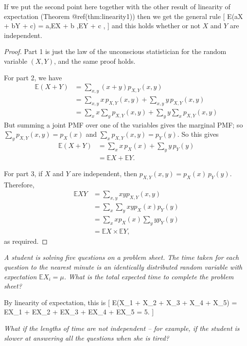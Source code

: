 \documentclass[
  letterpaper,
  DIV=11,
  numbers=noendperiod]{scrreprt}
\theoremstyle{remark}
\begin{document}
If we put the second point here together with the other result of
linearity of expectation (Theorem @ref(thm:linearity1)) then we get the
general rule {[} \mathbb E(aX + bY + c) = a,\mathbb EX + b ,\mathbb EY +
c , {]} and this holds whether or not \(X\) and \(Y\) are independent.

\begin{proof}

Part 1 is just the law of the unconscious statistician for the random
variable \((X,Y)\), and the same proof holds.

For part 2, we have \begin{align*}
\mathbb E(X + Y) &= \sum_{x,y} (x + y)p_{X,Y}(x,y) \\
  &= \sum_{x,y} x\,p_{X,Y}(x,y) + \sum_{x,y} y\,p_{X,Y}(x,y) \\
  &= \sum_x x \sum_y p_{X,Y}(x,y) + \sum_y y \sum_x p_{X,Y}(x,y)
\end{align*} But summing a joint PMF over one of the variables gives the
marginal PMF; so \(\sum_y p_{X,Y}(x,y) = p_X(x)\) and
\(\sum_x p_{X,Y}(x,y) = p_Y(y)\). So this gives \begin{align*}
\mathbb E(X + Y) &= \sum_x x\, p_X(x) + \sum_y y\,p_Y(y) \\
&= \mathbb EX + \mathbb EY .
\end{align*}

For part 3, if \(X\) and \(Y\) are independent, then
\(p_{X,Y}(x,y) = p_X(x) \, p_Y(y)\). Therefore, \begin{align*}
\mathbb EXY &= \sum_{x,y} xy p_{X,Y}(x,y) \\
  &= \sum_x \sum_y xy p_X(x) p_Y(y) \\
  &= \sum_x x p_X(x) \sum_y y p_Y(y) \\
  &= \mathbb EX \times \mathbb EY,
\end{align*} as required.

\end{proof}

\emph{A student is solving five questions on a problem sheet. The time
taken for each question to the nearest minute is an identically
distributed random variable with expectation \(\mathbb EX_i = \mu\).
What is the total expected time to complete the problem sheet?}

By linearity of expectation, this is {[} \mathbb E(X\_1 + X\_2 + X\_3 +
X\_4 + X\_5) = \mathbb EX\_1 + \mathbb EX\_2 + \mathbb EX\_3 +
\mathbb EX\_4 + \mathbb EX\_5 = 5\mu . {]}

\emph{What if the lengths of time are not independent -- for example, if
the student is slower at answering all the questions when she is tired?}
\end{document}
